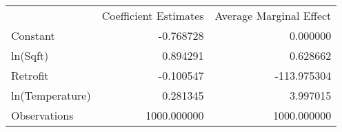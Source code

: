 \begin{tabular}{lrr}
 & Coefficient Estimates & Average Marginal Effect \\
Constant & -0.768728 & 0.000000 \\
ln(Sqft) & 0.894291 & 0.628662 \\
Retrofit & -0.100547 & -113.975304 \\
ln(Temperature) & 0.281345 & 3.997015 \\
Observations & 1000.000000 & 1000.000000 \\
\end{tabular}
